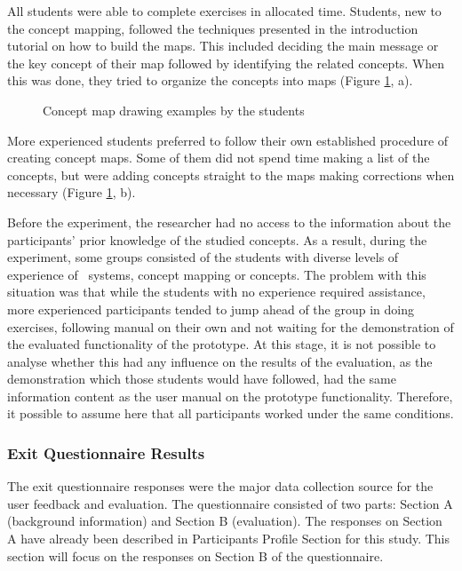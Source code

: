 All students were able to complete exercises in allocated time. Students, new to
the concept mapping, followed the techniques presented in the introduction
tutorial on how to build the maps. This included deciding the main message or
the key concept of their map followed by identifying the related concepts. When
this was done, they tried to organize the concepts into maps (Figure
\ref{fig:study2maps}, a).

\begin{figure}[htb]
\centering
\setlength\fboxsep{0pt}
\setlength\fboxrule{0.5pt}
\subfigure[Example 1]{
\fbox{\texttt{[image: CH7-F12-E2]}}
\label{fig:subfig1}
}
\subfigure[Example 2]{
\fbox{\texttt{[image: CH7-F12-E1]}}
\label{fig:subfig2}
}
\caption{Concept map drawing examples by the students}
\label{fig:study2maps}
\end{figure}
 
More experienced students preferred to follow their own established procedure of
creating concept maps. Some of them did not spend time making a list of the
concepts, but were adding concepts straight to the maps making corrections when
necessary (Figure \ref{fig:study2maps}, b).

Before the experiment, the researcher had no access to the information about
the participants' prior knowledge of the studied concepts. As a result, during
the experiment, some groups consisted of the students with diverse levels of
experience of \ep~systems, concept mapping or \LLLs concepts. The problem with
this situation was that while the students with no experience required
assistance, more experienced participants tended to jump ahead of the group in
doing exercises, following manual on their own and not waiting for the
demonstration of the evaluated functionality of the prototype. At this stage, it
is not possible to analyse whether this had any influence on the results of the
evaluation, as the demonstration which those students would have followed, had
the same information content as the user manual on the prototype functionality.
Therefore, it possible to assume here that all participants worked under the
same conditions.

\subsubsection{Exit Questionnaire Results}
The exit questionnaire responses were the major data collection source for the
user feedback and evaluation. The questionnaire consisted of two parts: Section
A (background information) and Section B (evaluation). The responses on Section
A have already been described in Participants Profile Section for this study. This
section will focus on the responses on Section B of the questionnaire. 


